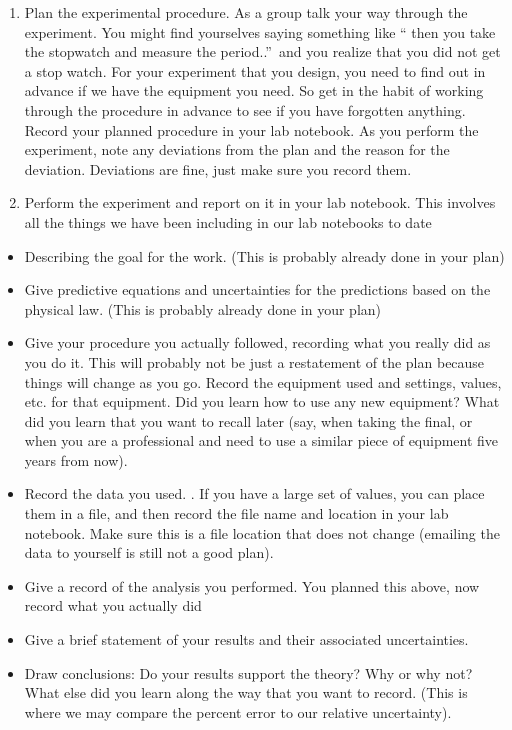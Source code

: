\documentclass[twoside,11pt,ShortChapTitles]{BYUTextbook}
\begin{document}
\begin{enumerate}
\item Plan the experimental procedure. As a group talk your way through the
experiment. You might find yourselves saying something like \textquotedblleft
then you take the stopwatch and measure the period..\textquotedblright\ and
you realize that you did not get a stop watch. For your experiment that you
design, you need to find out in advance if we have the equipment you need. So
get in the habit of working through the procedure in advance to see if you
have forgotten anything. Record your planned procedure in your lab notebook.
As you perform the experiment, note any deviations from the plan and the
reason for the deviation. Deviations are fine, just make sure you record them.

\item Perform the experiment and report on it in your lab notebook. This
involves all the things we have been including in our lab notebooks to date
\end{enumerate}

\begin{itemize}
\item Describing the goal for the work. (This is probably already done in your plan)

\item Give predictive equations and uncertainties for the predictions based on
the physical law. (This is probably already done in your plan)

\item Give your procedure you actually followed, recording what you really did
as you do it. This will probably not be just a restatement of the plan because
things will change as you go. Record the equipment used and settings, values,
etc. for that equipment. Did you learn how to use any new equipment? What did
you learn that you want to recall later (say, when taking the final, or when
you are a professional and need to use a similar piece of equipment five years
from now).

\item Record the data you used. . If you have a large set of values, you can
place them in a file, and then record the file name and location in your lab
notebook. Make sure this is a file location that does not change (emailing the
data to yourself is still not a good plan).

\item Give a record of the analysis you performed. You planned this above, now
record what you actually did

\item Give a brief statement of your results and their associated uncertainties.

\item Draw conclusions: Do your results support the theory? Why or why not?
What else did you learn along the way that you want to record. (This is where
we may compare the percent error to our relative uncertainty).
\end{itemize}
\end{document}
